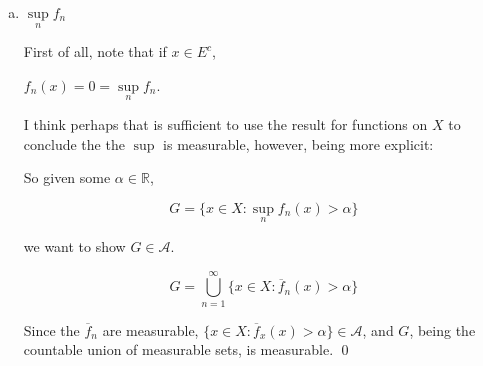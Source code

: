 \documentclass[11pt,oneside]{article}
\numberwithin{equation}{section}
\theoremstyle{definition}
\def\RR{\mathbb{R}}
\def\fancyA{\mathscr{A}}
\begin{document}
\begin{solution}
\begin{enumerate}[(a)]
  Now we show a sequence of combining mesaureable functions to get the result that $\overline f \overline g: X \to \overline \RR$ is measureable:

  $f, g$ are measurable, given.

  So $(f + g)$ is measurable, $\overline f + \overline g = \overline {( f + g)} $

  From the above lemma, $f^2$ and $g^2$ are measurable, as are $-f^2$ and $-g^2$.

  $ (f+g)^2$ is measurable.

  $(f^2 + 2 fg + g^2)$ is measurable (just pointwise expanding prior line).

  $(f^2 + 2 fg + g^2 - f^2 - g^2)$ is measurable (adding in $-f^2$ and $-g^2$)

  $2 f g $ is measurable.

  $ 1/2 \times 2 f g$ is measurable.

  $ f g$ is measurable.  
  \qed
  
\item
  $\sup \limits _{n} f_n$

  First of all, note that if $x \in E^c$,

  $f_n(x) = 0 = \sup \limits _ {n} f_n$.

  I think perhaps that is sufficient to use the result for functions
  on $X$ to conclude the the $\sup$ is measurable, however, being more explicit:
  
  So given some $\alpha \in \RR$,

  \[
  G = \{ x \in X : \sup \limits _{n} f_n(x) >  \alpha \}
  \]

  we want to show $G \in \fancyA$.

  \[
  G = \bigcup \limits _ {n=1} ^ \infty \{ x \in X : \overline f_n(x) > \alpha \}
  \]

  Since the $\overline f_n$ are measurable,  $\{ x \in X : \overline f_x(x) > \alpha \} \in \fancyA$,
  and $G$, being the countable union of measurable sets, is measurable.
  \qed
\end{enumerate}
\end{solution}
\end{document}
